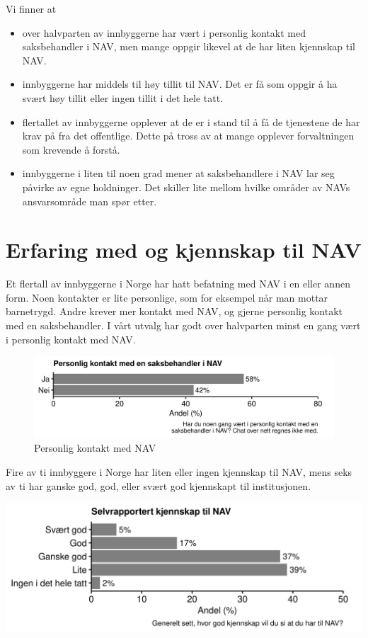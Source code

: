 \documentclass[
]{book}
\begin{document}
Vi finner at

\begin{itemize}
\item
  over halvparten av innbyggerne har vært i personlig kontakt med saksbehandler i NAV, men mange oppgir likevel at de har liten kjennskap til NAV.
\item
  innbyggerne har middels til høy tillit til NAV. Det er få som oppgir å ha svært høy tillit eller ingen tillit i det hele tatt.
\item
  flertallet av innbyggerne opplever at de er i stand til å få de tjenestene de har krav på fra det offentlige. Dette på tross av at mange opplever forvaltningen som krevende å forstå.
\item
  innbyggerne i liten til noen grad mener at saksbehandlere i NAV lar seg påvirke av egne holdninger. Det skiller lite mellom hvilke områder av NAVs ansvarsområde man spør etter.
\end{itemize}

\hypertarget{erfaring-med-og-kjennskap-til-nav}{%
\section{Erfaring med og kjennskap til NAV}\label{erfaring-med-og-kjennskap-til-nav}}

Et flertall av innbyggerne i Norge har hatt befatning med NAV i en eller annen form.
Noen kontakter er lite personlige, som for eksempel når man mottar barnetrygd.
Andre krever mer kontakt med NAV, og gjerne personlig kontakt med en saksbehandler.
I vårt utvalg har godt over halvparten minst en gang vært i personlig kontakt med NAV.

\begin{figure}
\centering
\includegraphics{figs/png/fig_nav_personal_contact.png}
\caption{Personlig kontakt med NAV}
\end{figure}

Fire av ti innbyggere i Norge har liten eller ingen kjennskap til NAV, mens seks av ti har ganske god, god, eller svært god kjennskapt til institusjonen.

\includegraphics{figs/png/fig_nav_knowledge.png}
\end{document}
